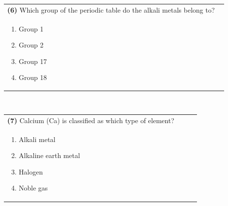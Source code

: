 \documentclass{article}
\begin{document}
\vspace{0.5cm}
\noindent \begin{tabular}{|p{0.9\linewidth}|}
\hline
\vspace{0.2cm}
\textbf{(6)} Which group of the periodic table do the alkali metals belong to? \\
\begin{minipage}[t]{0.85\linewidth}
\begin{enumerate}[label=\alph*.]
\item Group 1
\item Group 2
\item Group 17
\item Group 18
\end{enumerate}
\end{minipage}\\
\hline
\end{tabular}
\\

\vspace{0.5cm}
\noindent \begin{tabular}{|p{0.9\linewidth}|}
\hline
\vspace{0.2cm}
\textbf{(7)} Calcium (Ca) is classified as which type of element? \\
\begin{minipage}[t]{0.85\linewidth}
\begin{enumerate}[label=\alph*.]
\item Alkali metal
\item Alkaline earth metal
\item Halogen
\item Noble gas
\end{enumerate}
\end{minipage}\\
\hline
\end{tabular}
\\
\end{document}
